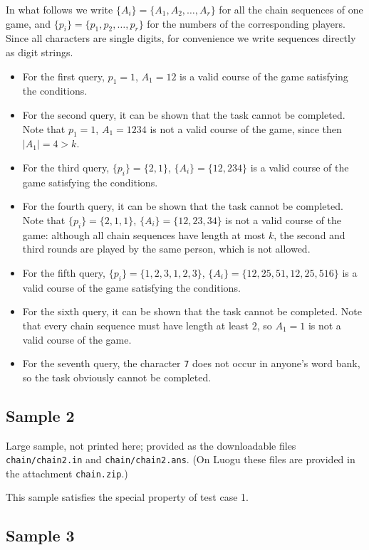 \documentclass[11pt]{article}
\begin{document}
In what follows we write $\{A_i\} = \{A_1, A_2, \dots, A_r\}$ for all the
chain sequences of one game, and $\{p_i\} = \{p_1, p_2, \dots, p_r\}$ for
the numbers of the corresponding players.
Since all characters are single digits, for convenience we write sequences
directly as digit strings.

\begin{itemize}
\item For the first query, $p_1 = 1$, $A_1 = 12$ is a valid course of the
game satisfying the conditions.
\item For the second query, it can be shown that the task cannot be
completed.
Note that $p_1 = 1$, $A_1 = 1234$ is not a valid course of the game, since
then $|A_1| = 4 > k$.
\item For the third query, $\{p_i\} = \{2, 1\}$,
$\{A_i\} = \{12, 234\}$ is a valid course of the game satisfying the
conditions.
\item For the fourth query, it can be shown that the task cannot be
completed.
Note that $\{p_i\} = \{2, 1, 1\}$, $\{A_i\} = \{12, 23, 34\}$ is not a
valid course of the game: although all chain sequences have length at most
$k$, the second and third rounds are played by the same person, which is
not allowed.
\item For the fifth query, $\{p_i\} = \{1, 2, 3, 1, 2, 3\}$,
$\{A_i\} = \{12, 25, 51, 12, 25, 516\}$ is a valid course of the game
satisfying the conditions.
\item For the sixth query, it can be shown that the task cannot be
completed.
Note that every chain sequence must have length at least $2$, so
$A_1 = 1$ is not a valid course of the game.
\item For the seventh query, the character \texttt{7} does not occur in
anyone's word bank, so the task obviously cannot be completed.
\end{itemize}

\subsection*{Sample 2}

Large sample, not printed here;
provided as the downloadable files \texttt{chain/chain2.in} and \texttt{chain/chain2.ans}.
(On Luogu these files are provided in the attachment \texttt{chain.zip}.)

This sample satisfies the special property of test case 1.

\subsection*{Sample 3}
\end{document}
